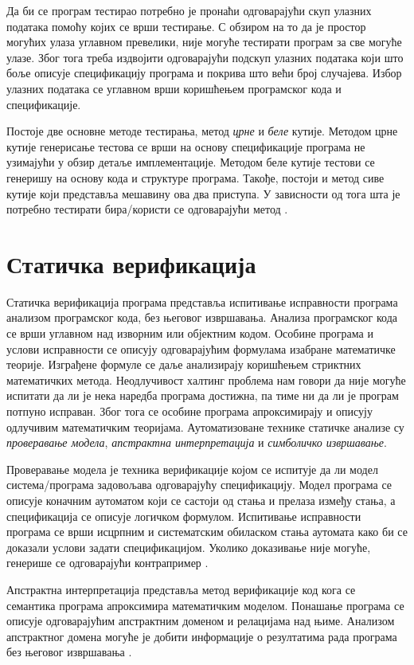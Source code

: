 \documentclass[12pt,oneside]{memoir}
\begin{document}
   Да би се програм тестирао потребно је пронаћи одговарајући скуп улазних података помоћу којих се врши тестирање.  С обзиром на то да је простор могућих улаза углавном превелики, није могуће тестирати програм за све могуће улазе. Због тога треба издвојити одговарајући подскуп улазних података који што боље описује спецификацију програма и покрива што већи број случајева. Избор улазних података се углавном врши коришћењем програмског кода и спецификације. 
   
    Постоје две основне методе тестирања, метод \emph{црне} и 
 \emph{беле} кутије.  Методом црне кутије генерисање тестова се врши на основу спецификације програма не узимајући у обзир детаље имплементације. Методом беле кутије тестови се генеришу на основу кода и структуре програма. Такође, постоји и метод сиве кутије који представља мешавину ова два приступа. У зависности од тога шта је потребно тестирати бира/користи се одговарајући метод \cite{testing}. 
  
  
  \section{Статичка верификација}
  \label{statver}
  Статичка верификација програма представља испитивање исправности програма анализом програмског кода, без његовог извршавања. Анализа програмског кода се врши углавном над изворним или објектним кодом. Особине програма и услови исправности се описују одговарајућим формулама изабране математичке теорије. Изграђене формуле се даље анализирају коришћењем стриктних математичких метода. Неодлучивост халтинг проблема нам говори да није могуће испитати да ли је нека наредба програма достижна, па тиме ни да ли је програм потпуно исправан. Због тога се особине програма апроксимирају и описују одлучивим математичким теоријама. Аутоматизоване технике статичке анализе су \emph{проверавање модела}, \emph{апстрактна интерпретација} и \emph{симболичко извршавање}.  
  
Проверавање модела је техника верификације којом се испитује да ли модел система/програма задовољава одговарајућу спецификацију. Модел програма се описује коначним аутоматом који се састоји од стања и прелаза између стања, а спецификација се описује логичком формулом. Испитивање исправности програма се врши исцрпним и систематским обиласком стања аутомата како би се доказали услови задати спецификацијом. Уколико доказивање није могуће, генерише се одговарајући контрапример \cite{verif_tech}.

Апстрактна интерпретација представља метод верификације код кога се семантика програма апроксимира математичким моделом. Понашање програма се описује одговарајућим апстрактним доменом и релацијама над њиме. Анализом апстрактног домена могуће је добити информације о резултатима рада програма без његовог извршавања \cite{verif_tech}. 
\end{document}
